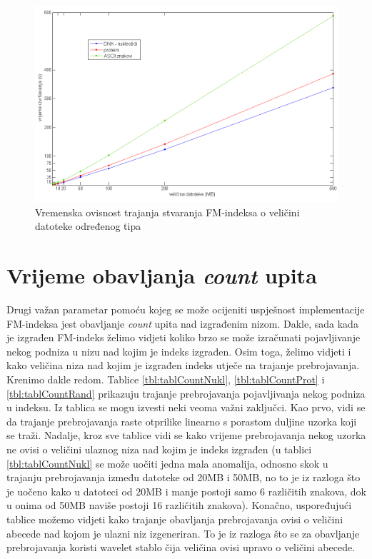\begin{figure}[H]
   \centering
       \includegraphics[width=\textwidth]{./pictures/test_fm.png}
 \caption{Vremenska ovisnost trajanja stvaranja FM-indeksa o veličini datoteke određenog tipa}
 \label{fig:test_fm}
\end{figure}




\section{Vrijeme obavljanja \textit{count} upita}

Drugi važan parametar pomoću kojeg se može ocijeniti uspješnost implementacije FM-indeksa jest obavljanje \textit{count} upita nad izgrađenim nizom. Dakle, sada kada je izgrađen FM-indeks želimo vidjeti koliko brzo se može izračunati pojavljivanje nekog podniza u nizu nad kojim je indeks izgrađen. Osim toga, želimo vidjeti i kako veličina niza nad kojim je izgrađen indeks utječe na trajanje prebrojavanja. Krenimo dakle redom. Tablice \ref{tbl:tablCountNukl}, \ref{tbl:tablCountProt} i \ref{tbl:tablCountRand} prikazuju trajanje prebrojavanja pojavljivanja nekog podniza u indeksu. Iz tablica se mogu izvesti neki veoma važni zaključci. Kao prvo, vidi se da trajanje prebrojavanja raste otprilike linearno s porastom duljine uzorka koji se traži. Nadalje, kroz sve tablice vidi se kako vrijeme prebrojavanja nekog uzorka ne ovisi o veličini ulaznog niza nad kojim je indeks izgrađen (u tablici \ref{tbl:tablCountNukl} se može uočiti jedna mala anomalija, odnosno skok u trajanju prebrojavanja između datoteke od 20MB i 50MB, no to je iz razloga što je uočeno kako u datoteci od 20MB i manje postoji samo 6 različitih znakova, dok u onima od 50MB naviše postoji 16 različitih znakova). Konačno, uspoređujući tablice možemo vidjeti kako trajanje obavljanja prebrojavanja ovisi o veličini abecede nad kojom je ulazni niz izgeneriran. To je iz razloga što se za obavljanje prebrojavanja koristi wavelet stablo čija veličina ovisi upravo o veličini abecede. 





